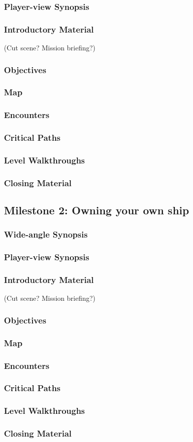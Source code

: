 \subsubsection{Player-view Synopsis}
\subsubsection{Introductory Material}
 (Cut scene?  Mission briefing?)
\subsubsection{Objectives}
\subsubsection{Map}
\subsubsection{Encounters}
\subsubsection{Critical Paths}
\subsubsection{Level Walkthroughs}
\subsubsection{Closing Material}

\subsection{Milestone 2: Owning your own ship}
\subsubsection{Wide-angle Synopsis}
\subsubsection{Player-view Synopsis}
\subsubsection{Introductory Material}
 (Cut scene?  Mission briefing?)
\subsubsection{Objectives}
\subsubsection{Map}
\subsubsection{Encounters}
\subsubsection{Critical Paths}
\subsubsection{Level Walkthroughs}
\subsubsection{Closing Material}
